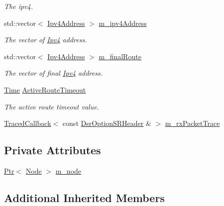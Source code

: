 \begin{DoxyCompactItemize}
\begin{DoxyCompactList}\small\item\em The ipv4. \end{DoxyCompactList}\item 
std\+::vector$<$ \hyperlink{classns3_1_1Ipv4Address}{Ipv4\+Address} $>$ \hyperlink{classns3_1_1dsr_1_1DsrOptions_ae89beb25929568d3d6053c263a627d3d}{m\+\_\+ipv4\+Address}
\begin{DoxyCompactList}\small\item\em The vector of \hyperlink{classns3_1_1Ipv4}{Ipv4} address. \end{DoxyCompactList}\item 
std\+::vector$<$ \hyperlink{classns3_1_1Ipv4Address}{Ipv4\+Address} $>$ \hyperlink{classns3_1_1dsr_1_1DsrOptions_a3fe6a72ebaae73724ce63383635b7af8}{m\+\_\+final\+Route}
\begin{DoxyCompactList}\small\item\em The vector of final \hyperlink{classns3_1_1Ipv4}{Ipv4} address. \end{DoxyCompactList}\item 
\hyperlink{classns3_1_1Time}{Time} \hyperlink{classns3_1_1dsr_1_1DsrOptions_a2d111e83b3c91f18ea49478a35ebb119}{Active\+Route\+Timeout}
\begin{DoxyCompactList}\small\item\em The active route timeout value. \end{DoxyCompactList}\item 
\hyperlink{classns3_1_1TracedCallback}{Traced\+Callback}$<$ const \hyperlink{classns3_1_1dsr_1_1DsrOptionSRHeader}{Dsr\+Option\+S\+R\+Header} \& $>$ \hyperlink{classns3_1_1dsr_1_1DsrOptions_a0c5d1c93d0a35c7e0049494377d16aa6}{m\+\_\+rx\+Packet\+Trace}
\end{DoxyCompactItemize}
\subsection*{Private Attributes}
\begin{DoxyCompactItemize}
\item 
\hyperlink{classns3_1_1Ptr}{Ptr}$<$ \hyperlink{classns3_1_1Node}{Node} $>$ \hyperlink{classns3_1_1dsr_1_1DsrOptions_afbf28d4fe766b82db848b03c986b6584}{m\+\_\+node}
\end{DoxyCompactItemize}
\subsection*{Additional Inherited Members}



